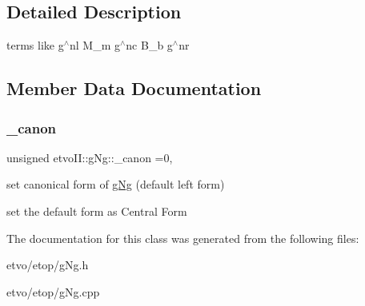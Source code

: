 \subsection{Detailed Description}
terms like g$^\wedge$nl M\+\_\+m g$^\wedge$nc B\+\_\+b g$^\wedge$nr 

\subsection{Member Data Documentation}
\mbox{\label{classetvo_i_i_1_1g_ng_a788cd29adc53a556f5070d76cfbd80b2}} 
\subsubsection{\texorpdfstring{\+\_\+canon}{\_canon}}
{\footnotesize\ttfamily unsigned etvo\+I\+I\+::g\+Ng\+::\+\_\+canon =0\hspace{0.3cm}{\ttfamily [static]}, {\ttfamily [protected]}}



set canonical form of \mbox{\hyperlink{classetvo_i_i_1_1g_ng}{g\+Ng}} (default left form) 

set the default form as Central Form 

The documentation for this class was generated from the following files\+:\begin{DoxyCompactItemize}
\item 
etvo/etop/g\+Ng.\+h\item 
etvo/etop/g\+Ng.\+cpp\end{DoxyCompactItemize}
